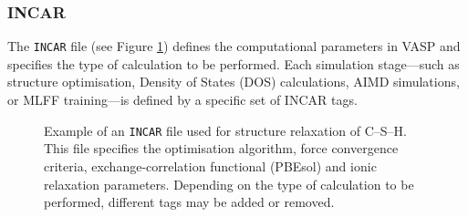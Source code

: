 \subsubsection{INCAR}
The \texttt{INCAR} file (see Figure \ref{fig:incar}) defines the computational parameters in VASP and specifies the type of calculation to be performed. Each simulation stage---such as structure optimisation, Density of States (DOS) calculations, AIMD simulations, or MLFF training---is defined by a specific set of INCAR tags. 
\begin{figure}[H]  
	\centering  
	\begin{threeparttable}  
		\caption{Example of an \texttt{INCAR} file used for structure relaxation of  C--S--H. This file specifies the optimisation algorithm, force convergence criteria, exchange-correlation functional (PBEsol) and ionic relaxation parameters. Depending on the type of calculation to be performed, different tags may be added or removed.
        }  
		\label{fig:incar}  
\end{threeparttable}
\end{figure}
